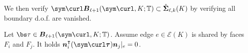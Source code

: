 

We then verify $\sym \curl \boldsymbol B_{\ell+1}(\sym\curl, K;\mathbb T) \subset \mathring{\boldsymbol \Sigma}_{\ell,k}(K)$ by verifying all boundary d.o.f. are vanished. 
\begin{lemma}\label{lem:symcurledgeprop}
Let $\bs\tau \in \boldsymbol B_{\ell+1}(\sym\curl, K;\mathbb T)$. Assume edge $e\in\mathcal E(K)$ is shared by faces $F_i$ and $F_j$. It holds $\boldsymbol  n_i^{\intercal}(\sym\curl\boldsymbol \tau )\boldsymbol n_j|_e=0$.
\end{lemma}
